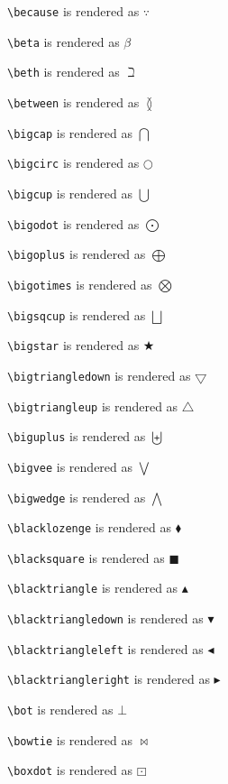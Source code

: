 \texttt{\textbackslash because} is rendered as $\because$

\texttt{\textbackslash beta} is rendered as $\beta$

\texttt{\textbackslash beth} is rendered as $\beth$

\texttt{\textbackslash between} is rendered as $\between$

\texttt{\textbackslash bigcap} is rendered as $\bigcap$

\texttt{\textbackslash bigcirc} is rendered as $\bigcirc$

\texttt{\textbackslash bigcup} is rendered as $\bigcup$

\texttt{\textbackslash bigodot} is rendered as $\bigodot$

\texttt{\textbackslash bigoplus} is rendered as $\bigoplus$

\texttt{\textbackslash bigotimes} is rendered as $\bigotimes$

\texttt{\textbackslash bigsqcup} is rendered as $\bigsqcup$

\texttt{\textbackslash bigstar} is rendered as $\bigstar$

\texttt{\textbackslash bigtriangledown} is rendered as $\bigtriangledown$

\texttt{\textbackslash bigtriangleup} is rendered as $\bigtriangleup$

\texttt{\textbackslash biguplus} is rendered as $\biguplus$

\texttt{\textbackslash bigvee} is rendered as $\bigvee$

\texttt{\textbackslash bigwedge} is rendered as $\bigwedge$

\texttt{\textbackslash blacklozenge} is rendered as $\blacklozenge$

\texttt{\textbackslash blacksquare} is rendered as $\blacksquare$

\texttt{\textbackslash blacktriangle} is rendered as $\blacktriangle$

\texttt{\textbackslash blacktriangledown} is rendered as $\blacktriangledown$

\texttt{\textbackslash blacktriangleleft} is rendered as $\blacktriangleleft$

\texttt{\textbackslash blacktriangleright} is rendered as $\blacktriangleright$

\texttt{\textbackslash bot} is rendered as $\bot$

\texttt{\textbackslash bowtie} is rendered as $\bowtie$

\texttt{\textbackslash boxdot} is rendered as $\boxdot$

